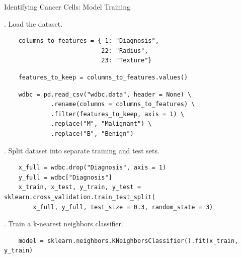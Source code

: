 \documentclass[8pt,aspectratio=169]{beamer}
\begin{document}

\begin{frame}[fragile]{Identifying Cancer Cells: Model Training}

. Load the dataset.

\pause
\begin{verbatim}
    columns_to_features = { 1: "Diagnosis",
                           22: "Radius",
                           23: "Texture"}
\end{verbatim}
\pause
\begin{verbatim}
    features_to_keep = columns_to_features.values()
\end{verbatim}
\pause
\begin{verbatim}
    wdbc = pd.read_csv("wdbc.data", header = None) \
             .rename(columns = columns_to_features) \
             .filter(features_to_keep, axis = 1) \
             .replace("M", "Malignant") \
             .replace("B", "Benign")
\end{verbatim}

. Split dataset into separate training and test sets.

\pause
\begin{verbatim}
    x_full = wdbc.drop("Diagnosis", axis = 1)
    y_full = wdbc["Diagnosis"]
    x_train, x_test, y_train, y_test = sklearn.cross_validation.train_test_split(
        x_full, y_full, test_size = 0.3, random_state = 3)
\end{verbatim}

\pause
3. Train a k-nearest neighbors classifier.

\pause
\begin{verbatim}
    model = sklearn.neighbors.KNeighborsClassifier().fit(x_train, y_train)
\end{verbatim}

\end{frame}

\end{document}
